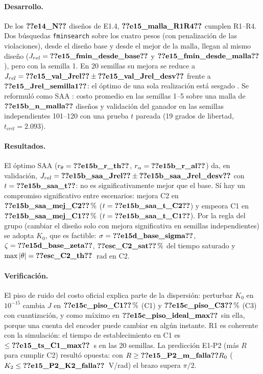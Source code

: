 \documentclass[11pt,a4paper]{article}
\begin{document}
\paragraph{Desarrollo.} De los $\V{e14_N}$ diseños de E1.4, $\V{e15_malla_R1R4}$ cumplen R1--R4. Dos búsquedas
\texttt{fminsearch} sobre los cuatro pesos (con penalización de las violaciones), desde el diseño base y desde el mejor
de la malla, llegan al mismo diseño ($J_{rel}=\V{e15_fmin_desde_base}$ y $\V{e15_fmin_desde_malla}$), pero con la
semilla 1. En 20 semillas su mejora se reduce a $J_{rel}=\V{e15_val_Jrel}\pm\V{e15_val_Jrel_desv}$ frente a
$\V{e15_Jrel_semilla1}$: el óptimo de una sola realización está sesgado \cite{smith2006}. Se reformuló como SAA
\cite{kleywegt2002}: costo promedio en las semillas 1--5 sobre una malla de $\V{e15b_n_malla}$ diseños y validación del ganador
en las semillas independientes 101--120 con una prueba $t$ pareada (19 grados de libertad, $t_{crit}=2.093$).

\paragraph{Resultados.} El óptimo SAA ($r_\theta=\V{e15b_r_th}$, $r_\alpha=\V{e15b_r_al}$) da, en validación,
$J_{rel}=\V{e15b_saa_Jrel}\pm\V{e15b_saa_Jrel_desv}$ con $t=\V{e15b_saa_t}$: no es significativamente mejor que el base.
Sí hay un compromiso significativo entre escenarios: mejora C2 en $\V{e15b_saa_mej_C2}\,\%$ ($t=\V{e15b_saa_t_C2}$) y
empeora C1 en $\V{e15b_saa_mej_C1}\,\%$ ($t=\V{e15b_saa_t_C1}$). Por la regla del grupo (cambiar el diseño solo con
mejora significativa en semillas independientes) se adopta $K_0$, que es factible: $\sigma=\V{e15d_base_sigma}$,
$\zeta=\V{e15d_base_zeta}$, $\V{esc_C2_sat}\,\%$ del tiempo saturado y $\max|\theta|=\V{esc_C2_th}$~rad en C2.

\paragraph{Verificación.} El piso de ruido del costo oficial explica parte de la dispersión: perturbar $K_0$ en
$10^{-15}$ cambia $J$ en $\V{e15c_piso_C1}\,\%$ (C1) y $\V{e15c_piso_C3}\,\%$ (C3) con cuantización, y como máximo en
$\V{e15c_piso_ideal_max}$ sin ella, porque una cuenta del encoder puede cambiar en algún instante. R1 es
coherente con la simulación: el tiempo de establecimiento en C1 es $\le\V{e15_ts_C1_max}$~s en las 20 semillas.
La predicción E1-P2 (más $R$ para cumplir C2) resultó opuesta: con $R\ge\V{e15_P2_m_falla}R_0$
($K_2\le\V{e15_P2_K2_falla}$~V/rad) el brazo supera $\pi/2$.
\end{document}
